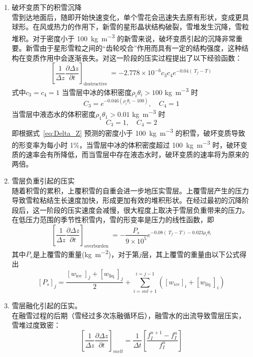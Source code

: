 \begin{enumerate}
\item 破坏变质下的积雪沉降\\
雪到达地面后，随即开始快速变化，单个雪花会迅速失去原有形状，变成更具球形。在风或热力的作用下，新雪的星形晶状结构破裂，雪堆发生沉降，雪粒堆积。对于密度小于 \qty{100}{kg.m^{-3}} 的新雪来说，破坏变质引起的沉降非常重要。新雪由于星形雪粒之间的“齿轮咬合”作用而具有一定的结构强度，这种结构在变质作用中会逐渐丧失。\citet{anderson1976point}对这一阶段的压实过程提出了以下经验函数：
\begin{equation}\label{eq:Delta_Z}
\left[\frac{1}{\Delta {z}} \frac{\partial \Delta {z}}{\partial {t}}\right]_{\text {destructive }}=-2.778 \times 10^{-6} {c}_{3} {c}_{4} {e}^{-0.04\left({~T}_{{f}}-{T}\right)}
\end{equation}
式中${c}_{3}={c}_{4}=1$
当雪层中冰的体积密度$\rho_{i} \theta_{i}>100$ \unit{kg.m^{-3}} 时
\begin{equation}
{C}_{3}={e}^{-0.046\left(\rho_{{i}} \theta_{{i}}-100\right)}, \quad {C}_{4}=1
\end{equation}
当雪层中液态水的体积密度$\rho_{1} \theta_{1}>0.01$ \unit{kg.m^{-3}} 时
\begin{equation}
{C}_{3}=1,\quad  {C}_{4}=2
\end{equation}
即根据式~\eqref{eq:Delta_Z} 预测的密度小于 \qty{100}{kg.m^{-3}} 的积雪，破坏变质导致的形变率为每小时 1\%，当雪层中冰的体积密度超过 \qty{100}{kg.m^{-3}} 时，破环变质的速率会有所降低，而当雪层中存在液态水时，破环变质的速率将为原来的两倍。

\item 雪层负重引起的压实\\
随着积雪的累积，上覆积雪的自重会进一步地压实雪层。上覆雪层产生的压力导致雪粒粘结生长速度加快，形成更加有效的堆积形状。在经过最初的沉降阶段后，这一阶段的压实速度会减慢，很大程度上取决于雪层负重带来的压力。在低压力范围的季节性积雪内，雪的形变率是压力的线性函数，即
\begin{equation}
\left[\frac{1}{\Delta {z}} \frac{\partial \Delta {z}}{\partial {t}}\right]_{\text {overburden }}=-\frac{{P}_{{s}}}{9 \times 10^{5}} {e}^{-0.08\left({~T}_{{f}}-{T}\right)-0.023 \rho_{{i}} \theta_{{i}}}
\end{equation}
其中$P_{s}$是上覆雪的重量(\unit{kg.m^{-2}})，对于第$j$层，其上覆雪的重量由以下公式得出
\begin{equation}
\left[P_{s}\right]_{j}=\frac{\left[w_{\text {ice }}\right]_{j}+\left[w_{\text {liq }}\right]_{j}}{2}+\sum_{{i}={snl}+1}^{{i}={j}-1}\left(\left[{w}_{{ice}}\right]_{{i}}+\left[{w}_{\text {liq }}\right]_{{i}}\right)
\end{equation}

\item 雪层融化引起的压实。\\
在融雪过程的后期（雪经过多次冻融循环后），融雪水的出流导致雪层压实，雪堆过度致密：
\begin{equation}
\left[\frac{1}{\Delta {z}} \frac{\partial \Delta {z}}{\partial {t}}\right]_{{melt}}=\frac{1}{\Delta {t}}\left[\frac{{f}_{{I}}^{{n}+1}-{f}_{{I}}^{{n}}}{{f}_{{I}}^{{n}}}\right]
\end{equation}
\end{enumerate}
